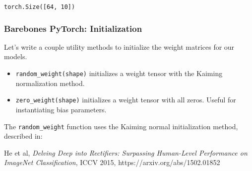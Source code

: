 \documentclass[11pt]{article}
\providecommand{\tightlist}{%
      \setlength{\itemsep}{0pt}\setlength{\parskip}{0pt}}
\begin{document}
    \begin{Verbatim}[commandchars=\\\{\}]
torch.Size([64, 10])
    \end{Verbatim}

    \hypertarget{barebones-pytorch-initialization}{%
\subsubsection{Barebones PyTorch:
Initialization}\label{barebones-pytorch-initialization}}

Let's write a couple utility methods to initialize the weight matrices
for our models.

\begin{itemize}
\tightlist
\item
  \texttt{random\_weight(shape)} initializes a weight tensor with the
  Kaiming normalization method.
\item
  \texttt{zero\_weight(shape)} initializes a weight tensor with all
  zeros. Useful for instantiating bias parameters.
\end{itemize}

The \texttt{random\_weight} function uses the Kaiming normal
initialization method, described in:

He et al, \emph{Delving Deep into Rectifiers: Surpassing Human-Level
Performance on ImageNet Classification}, ICCV 2015,
https://arxiv.org/abs/1502.01852
\end{document}
